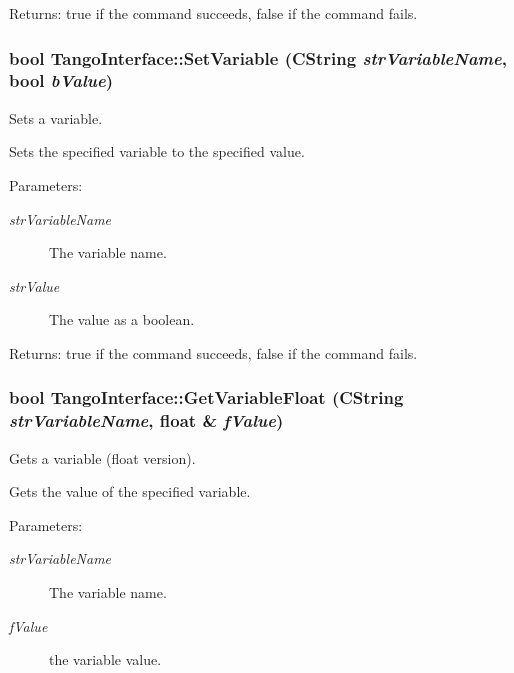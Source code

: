 \begin{Desc}
\item[Returns:]true if the command succeeds, false if the command fails. \end{Desc}
\hypertarget{classTangoInterface_d99eec46ef2205c72d4dc562154f6474}{
\subsubsection[SetVariable]{\setlength{\rightskip}{0pt plus 5cm}bool TangoInterface::SetVariable (CString {\em strVariableName}, \/  bool {\em bValue})}}
\label{classTangoInterface_d99eec46ef2205c72d4dc562154f6474}


Sets a variable. 

Sets the specified variable to the specified value.

\begin{Desc}
\item[Parameters:]
\begin{description}
\item[{\em strVariableName}]The variable name. \item[{\em strValue}]The value as a boolean. \end{description}
\end{Desc}


\begin{Desc}
\item[Returns:]true if the command succeeds, false if the command fails. \end{Desc}
\hypertarget{classTangoInterface_f981459258550748b98541a18c6e8f54}{
\subsubsection[GetVariableFloat]{\setlength{\rightskip}{0pt plus 5cm}bool TangoInterface::GetVariableFloat (CString {\em strVariableName}, \/  float \& {\em fValue})}}
\label{classTangoInterface_f981459258550748b98541a18c6e8f54}


Gets a variable (float version). 

Gets the value of the specified variable.

\begin{Desc}
\item[Parameters:]
\begin{description}
\item[{\em strVariableName}]The variable name. \item[{\em fValue}]the variable value. \end{description}
\end{Desc}


